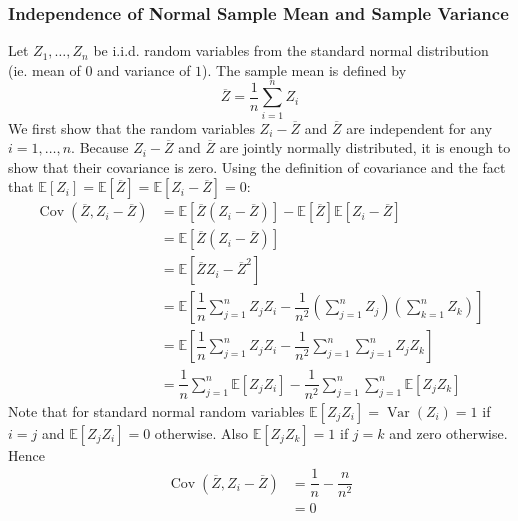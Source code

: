 \documentclass[11pt]{report} %
\begin{document}
\subsubsection{Independence of Normal Sample Mean and Sample Variance}

Let $Z_{1}, \dots, Z_{n}$ be i.i.d. random variables from the standard normal distribution (ie. mean of $0$ and variance of $1$). The sample mean is defined by
\begin{equation}
\overline{Z} = \dfrac{1}{n}\sum_{i = 1}^{n}Z_{i}
\end{equation}
We first show that the random variables $Z_{i} - \overline{Z}$ and $\overline{Z}$ are independent for any $i = 1, \dots, n$. Because $Z_{i} - \overline{Z}$ and $\overline{Z}$ are jointly normally distributed, it is enough to show that their covariance is zero. Using the definition of covariance and the fact that $\mathbb{E}\left[Z_{i}\right] = \mathbb{E}\left[\overline{Z}\right] = \mathbb{E}\left[Z_{i} - \overline{Z}\right] = 0$:
\begin{align}
\operatorname{Cov}\left(\overline{Z}, Z_{i} - \overline{Z}\right) &= \mathbb{E}\left[\overline{Z}\left(Z_{i} - \overline{Z}\right)\right] - \mathbb{E}\left[\overline{Z}\right]\mathbb{E}\left[Z_{i} - \overline{Z}\right] \\
&= \mathbb{E}\left[\overline{Z}\left(Z_{i} - \overline{Z}\right)\right] \\
&= \mathbb{E}\left[\overline{Z}Z_{i} - \overline{Z}^{2}\right] \\
&= \mathbb{E}\left[\dfrac{1}{n}\sum_{j = 1}^{n}Z_{j}Z_{i} - \dfrac{1}{n^{2}}\left(\sum_{j = 1}^{n}Z_{j}\right)\left(\sum_{k = 1}^{n}Z_{k}\right)\right] \\
&= \mathbb{E}\left[\dfrac{1}{n}\sum_{j = 1}^{n}Z_{j}Z_{i} - \dfrac{1}{n^{2}}\sum_{j = 1}^{n}\sum_{j = 1}^{n}Z_{j}Z_{k}\right] \\
&= \dfrac{1}{n}\sum_{j = 1}^{n}\mathbb{E}\left[Z_{j}Z_{i}\right] - \dfrac{1}{n^{2}}\sum_{j = 1}^{n}\sum_{j = 1}^{n}\mathbb{E}\left[Z_{j}Z_{k}\right]
\end{align}
Note that for standard normal random variables $\mathbb{E}\left[Z_{j}Z_{i}\right] = \operatorname{Var}\left(Z_{i}\right) = 1$ if $i = j$ and $\mathbb{E}\left[Z_{j}Z_{i}\right] = 0$ otherwise. Also $\mathbb{E}\left[Z_{j}Z_{k}\right] = 1$ if $j = k$ and zero otherwise. Hence
\begin{align}
\operatorname{Cov}\left(\overline{Z}, Z_{i} - \overline{Z}\right) &= \dfrac{1}{n} - \dfrac{n}{n^{2}} \\
&= 0
\end{align}
\end{document}
